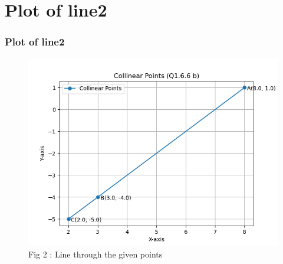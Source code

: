 \documentclass{beamer}
\theoremstyle{remark}
\numberwithin{equation}{section}
\begin{document}
\section{Plot of line2}

\begin{frame}
\frametitle{Plot of line2}

\begin{figure}[h!]
  \centering
  \includegraphics[width=0.5\columnwidth]{figs/fig_b.png} 
   \caption*{Fig 2 : Line through the given points}
  \label{Fig2}
\end{figure}

\end{frame}
\end{document}
